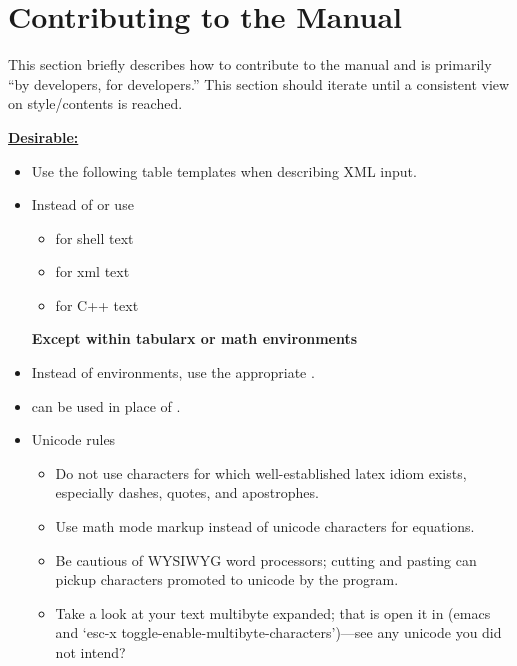 
\chapter{Contributing to the Manual}
\label{chap:contrib}

This section briefly describes how to contribute to the manual and is primarily ``by developers, for developers.''   This section should iterate until a consistent view on style/contents is reached.

\textbf{\underline{Desirable:}}
\begin{itemize}
\item{Use the following table templates when describing XML input.}
\item{Instead of \ilatex{\\texttt} or \ilatex{\\verb} use
    \begin{itemize}
      \item{\ilatex{\\ishell} for shell text}
      \item{\ilatex{\\ixml} for xml text}
      \item{\ilatex{\\icode} for C++ text}
      \end{itemize}
     \bf{Except} within tabularx or math environments}
    \item{Instead of  environments, use the appropriate }.
\item{ can be used in place of }.
\item{Unicode rules}
\begin{itemize}
\item Do not use characters for which well-established latex idiom exists, especially dashes, quotes, and apostrophes.
\item Use math mode markup instead of unicode characters for equations.
\item Be cautious of WYSIWYG word processors; cutting and pasting can pickup characters promoted to unicode by the program.
\item Take a look at your text multibyte expanded; that is open it in (emacs and `esc-x toggle-enable-multibyte-characters')---see any unicode you did not intend?

\end{itemize}
\end{itemize}

